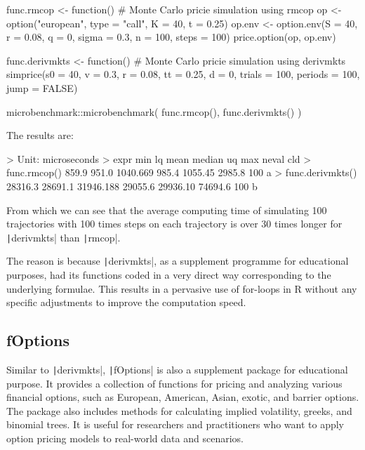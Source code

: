 \begin{Rminted}
func.rmcop <- function() { # Monte Carlo pricie simulation using rmcop
    op <- option("european", type = "call", K = 40, t = 0.25)
    op.env <- option.env(S = 40, r = 0.08, q = 0, sigma = 0.3, n = 100, steps = 100)
    price.option(op, op.env)
}

func.derivmkts <- function() { # Monte Carlo pricie simulation using derivmkts
    simprice(s0 = 40, v = 0.3, r = 0.08, tt = 0.25, d = 0,  trials = 100, periods = 100, jump = FALSE)
}

microbenchmark::microbenchmark(
    func.rmcop(),
    func.derivmkts()
)
\end{Rminted}

The results are:

\begin{Rminted}
> Unit: microseconds
>             expr     min      lq      mean  median       uq     max neval cld
>     func.rmcop()   859.9   951.0  1040.669   985.4  1055.45  2985.8   100  a 
> func.derivmkts() 28316.3 28691.1 31946.188 29055.6 29936.10 74694.6   100  b
\end{Rminted}

From which we can see that the average computing time of simulating 100 trajectories with 100 times steps on each trajectory is over 30 times longer for \texttt|derivmkts| than \texttt|rmcop|.

The reason is because \texttt|derivmkts|, as a supplement programme for educational purposes, had its functions coded in a very direct way corresponding to the underlying formulae. This results in a pervasive use of for-loops in R without any specific adjustments to improve the computation speed.


\subsection{fOptions} \label{sub:fOptions}

Similar to \texttt|derivmkts|, \texttt|fOptions| \cite{Wuertz2017} is also a supplement package for educational purpose. It provides a collection of functions for pricing and analyzing various financial options, such as European, American, Asian, exotic, and barrier options. The package also includes methods for calculating implied volatility, greeks, and binomial trees. It is useful for researchers and practitioners who want to apply option pricing models to real-world data and scenarios.

